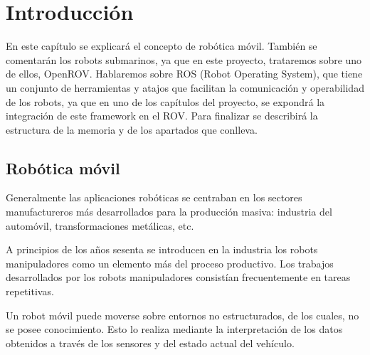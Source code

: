 \chapter{Introducción}

En este capítulo se explicará el concepto de robótica móvil\cite{RoboticaMovil}.
También se comentarán los robots submarinos, ya que en este proyecto, trataremos sobre uno de ellos, OpenROV.
Hablaremos sobre ROS (Robot Operating System), que tiene un conjunto de herramientas y atajos que facilitan la comunicación y operabilidad de los robots, ya que en uno de los capítulos del proyecto, se expondrá la integración de este framework en el ROV.
Para finalizar se describirá la estructura de la memoria y de los apartados que conlleva.

\section{Robótica móvil}
\label{cap:roboticamovil}
Generalmente las aplicaciones robóticas se centraban en los sectores manufactureros más desarrollados para la producción masiva: industria del automóvil, transformaciones metálicas, etc.

A principios de los años sesenta se introducen en la industria los robots manipuladores como un elemento más del proceso productivo. Los trabajos desarrollados por los robots manipuladores consistían frecuentemente en tareas repetitivas.

Un robot móvil puede moverse sobre entornos no estructurados, de los cuales, no se posee conocimiento. Esto lo realiza mediante la interpretación de los datos obtenidos a través de los sensores y del estado actual del vehículo. 

